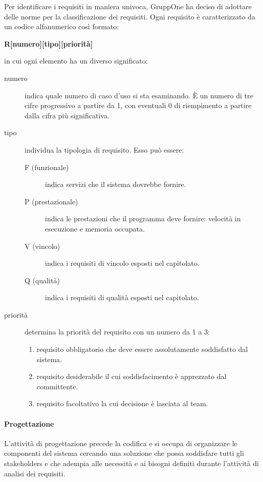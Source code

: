 \documentclass[../../norme-di-progetto.tex]{subfiles}
\begin{document}
Per identificare i requisiti in maniera univoca, GruppOne ha deciso di adottare delle norme per la classificazione dei requisiti.
Ogni requisito è caratterizzato da un codice alfanumerico così formato:
\begin{center}
  \textbf{R[numero][tipo][priorità]}
\end{center}
in cui ogni elemento ha un diverso significato:
\begin{description}
  \item [numero] indica quale numero di caso d'uso si sta esaminando. È un numero di tre cifre progressivo a partire da 1, con eventuali 0 di riempimento a partire dalla cifra più significativa.
  \item [tipo] individua la tipologia di requisito. Esso può essere:
        \begin{description}
          \item [F (funzionale)] indica servizi che il sistema dovrebbe fornire.
          \item [P (prestazionale)] indica le prestazioni che il programma deve fornire: velocità in esecuzione e memoria occupata.
          \item [V (vincolo)] indica i requisiti di vincolo esposti nel capitolato.
          \item [Q (qualità)] indica i requisiti di qualità esposti nel capitolato.
        \end{description}
  \item [priorità] determina la priorità del requisito con un numero da 1 a 3:
        \begin{enumerate}
          \item requisito obbligatorio che deve essere assolutamente soddisfatto dal sistema.
          \item requisito desiderabile il cui soddisfacimento è apprezzato dal committente.
          \item requisito facoltativo la cui decisione è lasciata al team.
        \end{enumerate}
\end{description}


\paragraph{Progettazione}%
\label{par:progettazione}
L'attività di progettazione precede la codifica e si occupa di organizzare le componenti del sistema cercando una soluzione che possa soddisfare tutti gli stakeholders e che adempia alle necessità e ai bisogni definiti durante l'attività di analisi dei requisiti.
\end{document}

